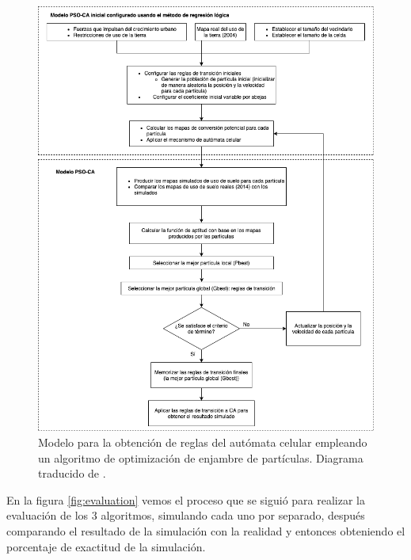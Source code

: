 \begin{figure}[H]
	\centering
	\includegraphics[width=\linewidth]{fig/particulas}
	\caption{Modelo para la obtención de reglas del autómata celular empleando un algoritmo de optimización de enjambre de partículas. Diagrama traducido de \cite{naghibi2016discovery}.}
	\label{fig:pso}
\end{figure}

En la figura \ref{fig:evaluation} vemos el proceso que se siguió para realizar la evaluación de los 3 algoritmos, simulando cada uno por separado, después comparando el resultado de la simulación con la realidad y entonces obteniendo el porcentaje de exactitud de la simulación.

